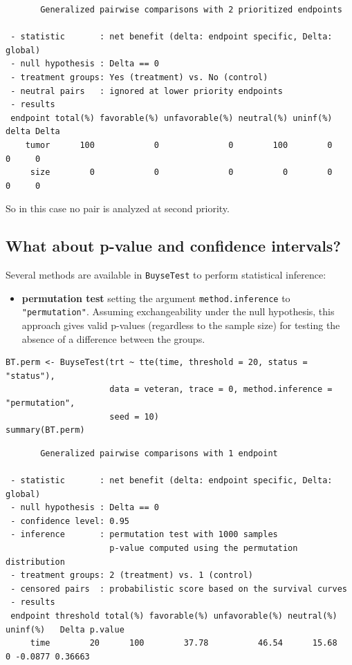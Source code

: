 \documentclass[12pt]{article}
\begin{document}
\begin{verbatim}
       Generalized pairwise comparisons with 2 prioritized endpoints

 - statistic       : net benefit (delta: endpoint specific, Delta: global) 
 - null hypothesis : Delta == 0 
 - treatment groups: Yes (treatment) vs. No (control) 
 - neutral pairs   : ignored at lower priority endpoints
 - results
 endpoint total(%) favorable(%) unfavorable(%) neutral(%) uninf(%) delta Delta
    tumor      100            0              0        100        0     0     0
     size        0            0              0          0        0     0     0
\end{verbatim}

So in this case no pair is analyzed at second priority.

\clearpage

\subsection{What about p-value and confidence intervals?}
\label{sec:org1e6cdd2}

Several methods are available in \texttt{BuyseTest} to perform statistical inference:
\begin{itemize}
\item \textbf{permutation test} setting the argument \texttt{method.inference} to
\texttt{"permutation"}. Assuming exchangeability under the null hypothesis,
this approach gives valid p-values (regardless to the sample size)
for testing the absence of a difference between the groups.
\end{itemize}
\lstset{language=r,label= ,caption= ,captionpos=b,numbers=none}
\begin{lstlisting}
BT.perm <- BuyseTest(trt ~ tte(time, threshold = 20, status = "status"),
                     data = veteran, trace = 0, method.inference = "permutation",
                     seed = 10) 
summary(BT.perm)
\end{lstlisting}

\begin{verbatim}
       Generalized pairwise comparisons with 1 endpoint

 - statistic       : net benefit (delta: endpoint specific, Delta: global) 
 - null hypothesis : Delta == 0 
 - confidence level: 0.95 
 - inference       : permutation test with 1000 samples 
                     p-value computed using the permutation distribution 
 - treatment groups: 2 (treatment) vs. 1 (control) 
 - censored pairs  : probabilistic score based on the survival curves
 - results
 endpoint threshold total(%) favorable(%) unfavorable(%) neutral(%) uninf(%)   Delta p.value 
     time        20      100        37.78          46.54      15.68        0 -0.0877 0.36663
\end{verbatim}
\end{document}
